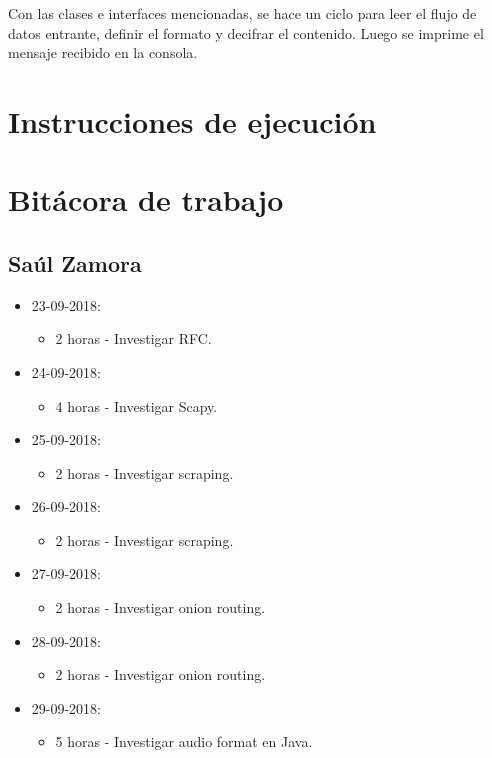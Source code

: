 \documentclass{article}
\begin{document}
Con las clases e interfaces mencionadas, se hace un ciclo para leer el flujo de datos entrante, definir el formato y decifrar el contenido. Luego se imprime el mensaje recibido en la consola.

\section{Instrucciones de ejecuci\'on}
\section{Bit\'acora de trabajo}
\subsection{Sa\'ul Zamora}
\begin{itemize}
  \item 23-09-2018:
  \begin{itemize}
    \item 2 horas - Investigar RFC.
  \end{itemize}
  \item 24-09-2018:
  \begin{itemize}
    \item 4 horas - Investigar Scapy.
  \end{itemize}
  \item 25-09-2018:
  \begin{itemize}
    \item 2 horas - Investigar scraping.
  \end{itemize}
  \item 26-09-2018:
  \begin{itemize}
    \item 2 horas - Investigar scraping.
  \end{itemize}
  \item 27-09-2018:
  \begin{itemize}
    \item 2 horas - Investigar onion routing.
  \end{itemize}
  \item 28-09-2018:
  \begin{itemize}
    \item 2 horas - Investigar onion routing.
  \end{itemize}
  \item 29-09-2018:
  \begin{itemize}
    \item 5 horas - Investigar audio format en Java.

\end{itemize}
\end{itemize}
\end{document}
